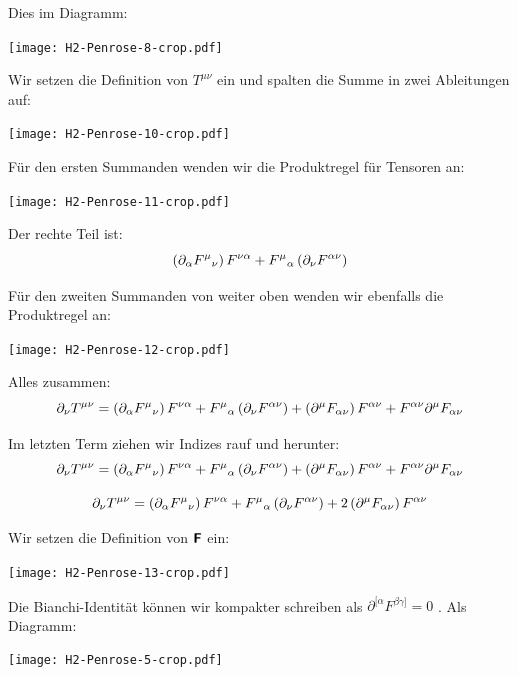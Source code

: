 Dies im Diagramm:
\begin{center}
	\texttt{[image: H2-Penrose-8-crop.pdf]}
\end{center}

Wir setzen die Definition von $T^{\mu\nu}$ ein und spalten die Summe in zwei
Ableitungen auf:
\begin{center}
	\texttt{[image: H2-Penrose-10-crop.pdf]}
\end{center}

Für den ersten Summanden wenden wir die Produktregel für Tensoren an:
\begin{center}
	\texttt{[image: H2-Penrose-11-crop.pdf]}
\end{center}

Der rechte Teil ist:
\[
	\del{\partial_\alpha F^{\mu}{}_\nu} F^{\nu\alpha}
	+ F^\mu{}_\alpha \del{\partial_\nu F^{\alpha\nu}}
\]

Für den zweiten Summanden von weiter oben wenden wir ebenfalls die Produktregel
an:
\begin{center}
	\texttt{[image: H2-Penrose-12-crop.pdf]}
\end{center}

Alles zusammen:
\[
	\partial_\nu T^{\mu\nu}
	=
	\del{\partial_\alpha F^{\mu}{}_\nu} F^{\nu\alpha}
	+ F^\mu{}_\alpha \del{\partial_\nu F^{\alpha\nu}}
	+ \del{\partial^\mu F_{\alpha\nu}} F^{\alpha\nu}
	+ F^{\alpha\nu} \partial^\mu F_{\alpha\nu}
\]

Im letzten Term ziehen wir Indizes rauf und herunter:
\[
	\partial_\nu T^{\mu\nu}
	=
	\del{\partial_\alpha F^{\mu}{}_\nu} F^{\nu\alpha}
	+ F^\mu{}_\alpha \del{\partial_\nu F^{\alpha\nu}}
	+ \del{\partial^\mu F_{\alpha\nu}} F^{\alpha\nu}
	+ F^{\alpha\nu} \partial^\mu F_{\alpha\nu}
\]

\[
	\partial_\nu T^{\mu\nu}
	=
	\del{\partial_\alpha F^{\mu}{}_\nu} F^{\nu\alpha}
	+ F^\mu{}_\alpha \del{\partial_\nu F^{\alpha\nu}}
	+ 2\del{\partial^\mu F_{\alpha\nu}} F^{\alpha\nu}
\]

Wir setzen die Definition von $\boldsymbol{\mathsf{F}}$ ein:
\begin{center}
	\texttt{[image: H2-Penrose-13-crop.pdf]}
\end{center}

Die Bianchi-Identität können wir kompakter schreiben als $\partial^{[\alpha}
F^{\beta\gamma]} = 0$ \cite[Seite 303]{penrose-road_to_reality}. Als Diagramm:
\begin{center}
	\texttt{[image: H2-Penrose-5-crop.pdf]}
\end{center}

